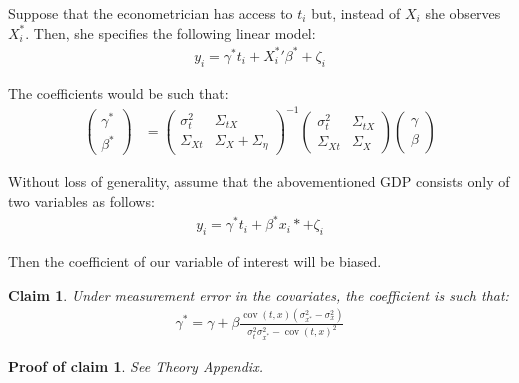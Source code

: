 \documentclass[10pt]{article}
\newtheorem{claim}{Claim}
\newtheorem{claimproof}{Proof of claim}[claim]
\begin{document}
        Suppose that the econometrician has access to $t_i$ but, instead of $X_i$ she observes $X^*_i$. Then, she specifies the following linear model:
        \begin{align}
            y_i = \gamma^* t_i + {X^{*}_i}' \beta^* + \zeta_i
        \end{align}
        
        The coefficients would be such that:
        \begin{align}
            \left(\begin{array}{l}
        {\gamma}^* \\
        {\beta}^*
        \end{array}\right)
        & =\left(\begin{array}{cc}
        {\sigma}^2_{t} & \Sigma_{tX} \\
        \Sigma_{Xt} & {\Sigma}_{X}+{\Sigma}_{\eta}
        \end{array}\right)^{-1}\left(\begin{array}{cc}
        {\sigma}^2_{t} & \Sigma_{tX} \\
        \Sigma_{Xt} & {\Sigma}_{X}
        \end{array}\right)\left(\begin{array}{l}
        {\gamma} \\
        {\beta}
        \end{array}\right)
        \end{align}
        
        Without loss of generality, assume that the abovementioned GDP consists only of two variables as follows:
        \begin{align}
                    y_i = \gamma^* t_i +  \beta^*x_i* + \zeta_i
        \end{align}
        
        Then the coefficient of our variable of interest will be biased.
        \begin{claim}
        \label{claim:one}
        Under measurement error in the covariates, the coefficient is such that:
            \begin{align}
                \gamma^* = \gamma + \beta\frac{\operatorname{cov}(t,x)(\sigma^2_{x^*}-\sigma^2_x)}{\sigma_{t}^2\sigma_{x^*}^2-\operatorname{cov}({t,x})^2}
            \end{align}
        \end{claim}

        \begin{claimproof}
            See Theory Appendix.
        \end{claimproof}
\end{document}
